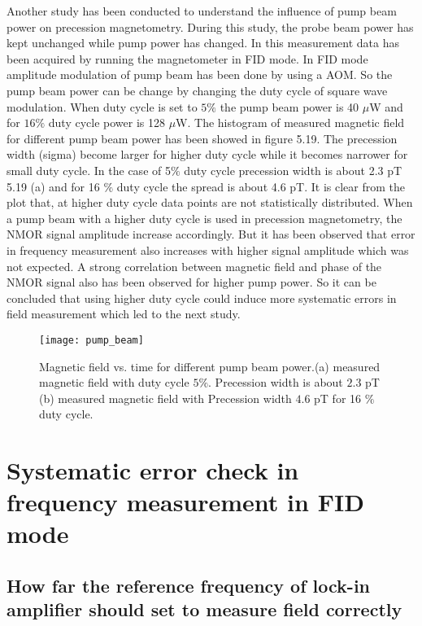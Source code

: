 \documentclass[12pt]{report}
\begin{document}
Another study has been conducted to understand the influence of pump beam power on precession magnetometry. During this study, the probe beam power has kept unchanged while pump power has changed. In this measurement data has been acquired by running the magnetometer in FID mode. In FID mode amplitude modulation of pump beam has been done by using a AOM.  So the pump beam power can be change by changing the duty cycle of square wave modulation. When duty cycle is set to $5\%$ the pump beam power is 40 $\mu$W and for $16 \%$ duty cycle power is 128 $\mu$W. The histogram of measured magnetic field for different pump beam power has been showed in figure 5.19. The precession width (sigma) become larger for higher duty cycle while it becomes narrower for small duty cycle. In the case of 5$\%$  duty cycle precession width is about 2.3 pT  5.19 (a) and for 16 $\%$ duty cycle the spread is about 4.6 pT. It is clear from the plot that, at higher duty cycle data points are not statistically distributed.  When a pump beam with a higher duty cycle is used  in precession magnetometry, the NMOR  signal amplitude increase accordingly. But it has been observed that error in frequency measurement also increases with higher signal amplitude which was not expected. A strong correlation between magnetic field and phase of the NMOR signal also has been observed for higher pump power. So it can be concluded that using higher duty cycle could induce more systematic errors in field measurement which led to the next study.
 \begin{figure}
    \centering  \texttt{[image: pump\_beam]}
    \caption{ Magnetic field vs. time for different pump beam power.(a) measured magnetic field with duty cycle $5 \%$. Precession width is about $2.3$ pT (b) measured magnetic field with Precession width $4.6$ pT for  16 $\%$ duty cycle.}
    \label{fig:three graphs}
\end{figure}
   \section{Systematic error check in frequency measurement in FID mode} 
   \subsection{How far the reference frequency of lock-in amplifier should set to measure field correctly}
  
\end{document}
